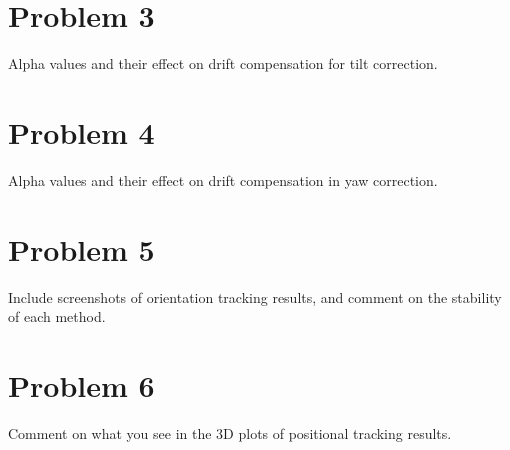 \documentclass[12pt,a4paper]{article}
\begin{document}
	\section*{Problem 3}
	
	Alpha values and their effect on drift compensation for tilt correction.
	
	\section*{Problem 4}
	
	Alpha values and their effect on drift compensation in yaw correction.
	
	\section*{Problem 5}
	
	Include screenshots of orientation tracking results, and comment on the stability of each method.
	
	\section*{Problem 6}
	
	Comment on what you see in the 3D plots of positional tracking results.
	
	
\end{document}
